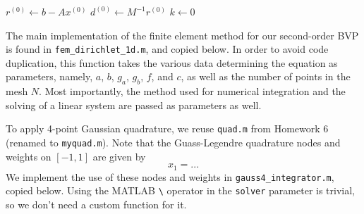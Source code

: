 \documentclass{homework}
\begin{document}
	\question
	\begin{alphaparts}
		\questionpart
		
		\begin{algorithm}
			$r^{(0)} \gets b - Ax^{(0)}$\;
			$d^{(0)} \gets M^{-1}r^{(0)}$\;
			$k \gets 0$\;
		\end{algorithm}
		\questionpart 
	\end{alphaparts}
	
	\question 
	\begin{alphaparts}
		\questionpart 
		The main implementation of the finite element method for our second-order BVP is found in \verb*|fem_dirichlet_1d.m|, and copied below. In order to avoid code duplication, this function takes the various data determining the equation as parameters, namely, $a$, $b$, $g_a$, $g_b$, $f$, and $c$, as well as the number of points in the mesh $N$. Most importantly, the method used for numerical integration and the solving of a linear system are passed as parameters as well.	
		
		
		To apply 4-point Gaussian quadrature, we reuse \verb*|quad.m| from Homework 6 (renamed to \verb*|myquad.m|). Note that the Guass-Legendre quadrature nodes and weights on $[-1,1]$ are given by
		\begin{equation}
			x_1 = ...
		\end{equation}
		We implement the use of these nodes and weights in \verb*|gauss4_integrator.m|, copied below. Using the MATLAB \verb*|\| operator in the \verb*|solver| parameter is trivial, so we don't need a custom function for it.
		
		
		\questionpart
		
	\end{alphaparts}
\end{document}

